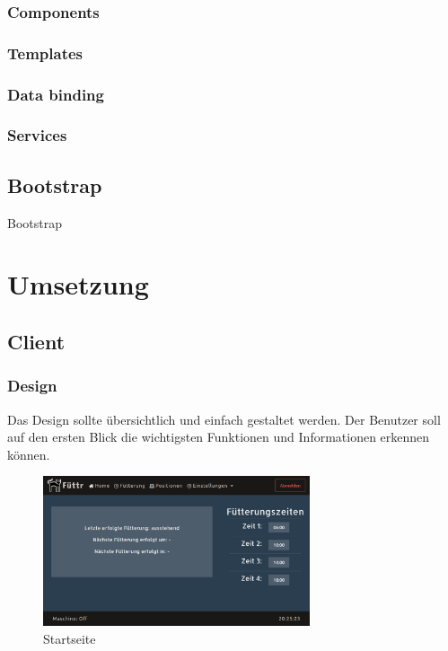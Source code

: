 \subsubsection{Components}

\subsubsection{Templates}

\subsubsection{Data binding}

\subsubsection{Services}

\subsection{Bootstrap}
Bootstrap 

\section{Umsetzung}

\subsection{Client}

\subsubsection{Design}
Das Design sollte übersichtlich und einfach gestaltet werden. Der Benutzer soll auf den ersten Blick die wichtigsten Funktionen und Informationen erkennen können. \\

\begin{figure}
\vspace{-30pt}
  \begin{center}
    \includegraphics[width=0.7\textwidth]{Bilder/Greistorfer/Home.png}
  \end{center}
  \caption{Startseite}
  \label{Startseite}
  \vspace{-10pt}
\end{figure}

